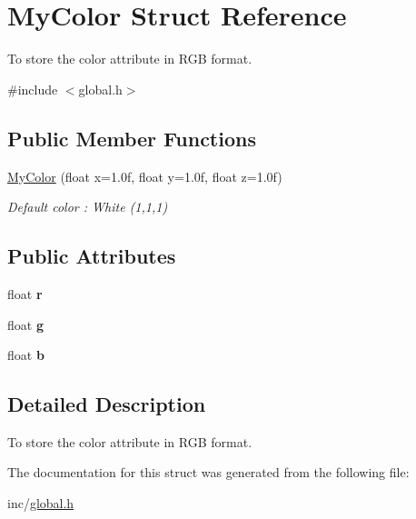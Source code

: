 \hypertarget{struct_my_color}{\section{My\-Color Struct Reference}
\label{struct_my_color}
}


To store the color attribute in R\-G\-B format.  




{\ttfamily \#include $<$global.\-h$>$}

\subsection*{Public Member Functions}
\begin{DoxyCompactItemize}
\item 
\hypertarget{struct_my_color_a302771d363e639bcfa689c9f50bff77e}{\hyperlink{struct_my_color_a302771d363e639bcfa689c9f50bff77e}{My\-Color} (float x=1.\-0f, float y=1.\-0f, float z=1.\-0f)}\label{struct_my_color_a302771d363e639bcfa689c9f50bff77e}

\begin{DoxyCompactList}\small\item\em Default color \-: White (1,1,1) \end{DoxyCompactList}\end{DoxyCompactItemize}
\subsection*{Public Attributes}
\begin{DoxyCompactItemize}
\item 
\hypertarget{struct_my_color_a6896e985748377872023ff289de81e38}{float {\bfseries r}}\label{struct_my_color_a6896e985748377872023ff289de81e38}

\item 
\hypertarget{struct_my_color_a5be05ae7bc1e8f2ad555289ceaaabc49}{float {\bfseries g}}\label{struct_my_color_a5be05ae7bc1e8f2ad555289ceaaabc49}

\item 
\hypertarget{struct_my_color_ab5cd80a5240026d4217bc9703442a897}{float {\bfseries b}}\label{struct_my_color_ab5cd80a5240026d4217bc9703442a897}

\end{DoxyCompactItemize}


\subsection{Detailed Description}
To store the color attribute in R\-G\-B format. 

The documentation for this struct was generated from the following file\-:\begin{DoxyCompactItemize}
\item 
inc/\hyperlink{global_8h}{global.\-h}\end{DoxyCompactItemize}
